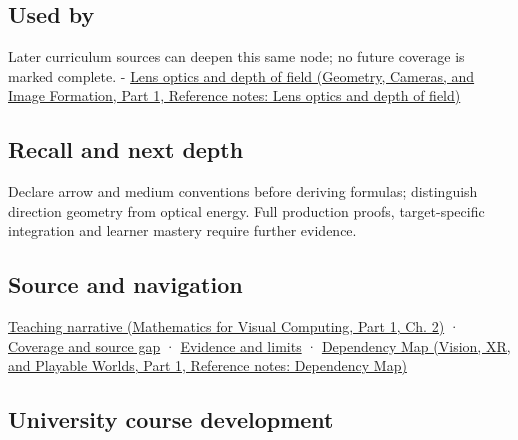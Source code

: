 \subsection{Used by}\label{appendix-44e00863b4d5-used-by}

\hypertarget{appendix-44e00863b4d5-used-by}{}

Later curriculum sources can deepen this same node; no future coverage is marked complete. - \href{../03-Geometry-Cameras-and-Image-Formation-P01/main.pdf\#nameddest=appendix-21f8456e2629}{Lens optics and depth of field (Geometry, Cameras, and Image Formation, Part 1, Reference notes: Lens optics and depth of field)}

\subsection{Recall and next depth}\label{appendix-44e00863b4d5-recall-and-next-depth}

\hypertarget{appendix-44e00863b4d5-recall-and-next-depth}{}

Declare arrow and medium conventions before deriving formulas; distinguish direction geometry from optical energy. Full production proofs, target-specific integration and learner mastery require further evidence.

\subsection{Source and navigation}\label{appendix-44e00863b4d5-source-and-navigation}

\hypertarget{appendix-44e00863b4d5-source-and-navigation}{}

\href{../02-Mathematics-for-Visual-Computing-P01/main.pdf\#nameddest=01-foundations-i-ch018-light-uses-the-same-decomposition-in-a-new-role}{Teaching narrative (Mathematics for Visual Computing, Part 1, Ch. 2)} · \hyperref[appendix-fd090d982a15-phase-6---parts-501-600]{Coverage and source gap} · \hyperref[appendix-a103e7846d21-phase-6---source-analysis-and-verification]{Evidence and limits} · \href{../07-Vision-XR-and-Playable-Worlds-P01/main.pdf\#nameddest=appendix-4ad47bdd269a}{Dependency Map (Vision, XR, and Playable Worlds, Part 1, Reference notes: Dependency Map)}

\subsection{University course development}\label{appendix-44e00863b4d5-university-course-development}

